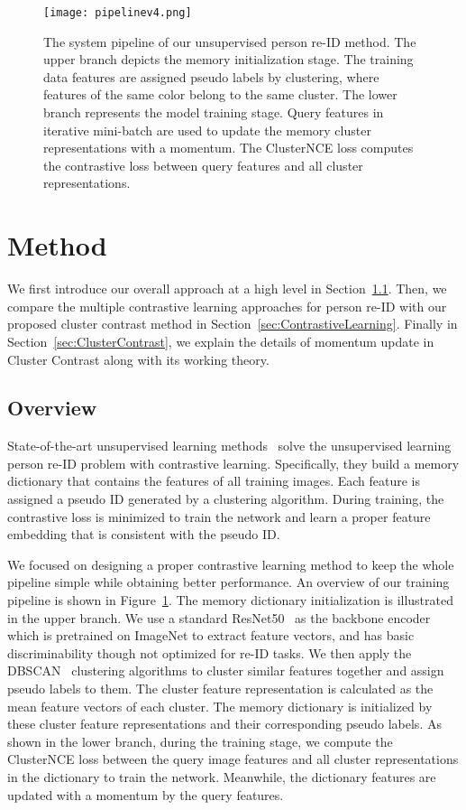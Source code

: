 \begin{figure}[!t]
    \centering
    \texttt{[image: pipelinev4.png]}
    \caption{The system pipeline of our unsupervised person re-ID method. The upper branch depicts the memory initialization stage. The training data features are assigned pseudo labels by clustering, where features of the same color belong to the same cluster. The lower branch represents the model training stage. Query features in iterative mini-batch are used to update the memory cluster representations with a momentum. The ClusterNCE loss computes the contrastive loss between query features and all cluster representations.}
    \label{fig:pipeline}
\end{figure}

\section{Method}
We first introduce our overall approach at a high level in Section~\ref{sec:overview}.
Then, we compare the multiple contrastive learning approaches for person re-ID with our proposed cluster contrast method in Section~\ref{sec:ContrastiveLearning}.
Finally in Section~\ref{sec:ClusterContrast}, we explain the details of momentum update in Cluster Contrast along with its working theory.

\subsection{Overview}
\label{sec:overview}

State-of-the-art unsupervised learning methods~\cite{wang2020unsupervised,ge2020mutual,ge2020self,chen2021ice} solve the unsupervised learning person re-ID problem with contrastive learning. 
Specifically, they build a memory dictionary that contains the features of all training images. 
Each feature is assigned a pseudo ID generated by a clustering algorithm. 
During training, the contrastive loss is minimized to train the network and learn a proper feature embedding that is consistent with the pseudo ID.

We focused on designing a proper contrastive learning method to keep the whole pipeline simple while obtaining better performance.
An overview of our training pipeline is shown in Figure~\ref{fig:pipeline}.
The memory dictionary initialization is illustrated in the upper branch.
We use a standard ResNet50~\cite{he2016deep} as the backbone encoder which is pretrained on ImageNet to extract feature vectors, and has basic discriminability though not optimized for re-ID tasks.
We then apply the DBSCAN~\cite{ester1996density} clustering algorithms to cluster similar features together and assign pseudo labels to them. 
The cluster feature representation is calculated as the mean feature vectors of each cluster. 
The memory dictionary is initialized by these cluster feature representations and their corresponding pseudo labels. 
As shown in the lower branch, during the training stage, we compute the ClusterNCE loss between the query image features and all cluster representations in the dictionary to train the network. 
Meanwhile, the dictionary features are updated with a momentum by the query features.

